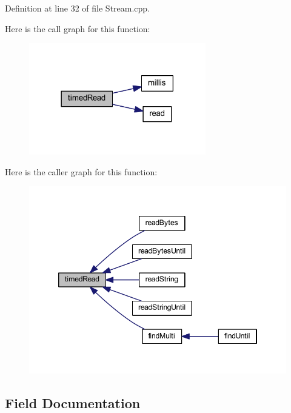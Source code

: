 Definition at line 32 of file Stream.\+cpp.



Here is the call graph for this function\+:
\nopagebreak
\begin{figure}[H]
\begin{center}
\leavevmode
\includegraphics[width=218pt]{class_stream_a7cc09dd787a79c17281039b4456dc6aa_cgraph}
\end{center}
\end{figure}




Here is the caller graph for this function\+:
\nopagebreak
\begin{figure}[H]
\begin{center}
\leavevmode
\includegraphics[width=346pt]{class_stream_a7cc09dd787a79c17281039b4456dc6aa_icgraph}
\end{center}
\end{figure}




\subsection{Field Documentation}
\hypertarget{class_stream_a30515d765ff208be483b71592aa9da72}{}
